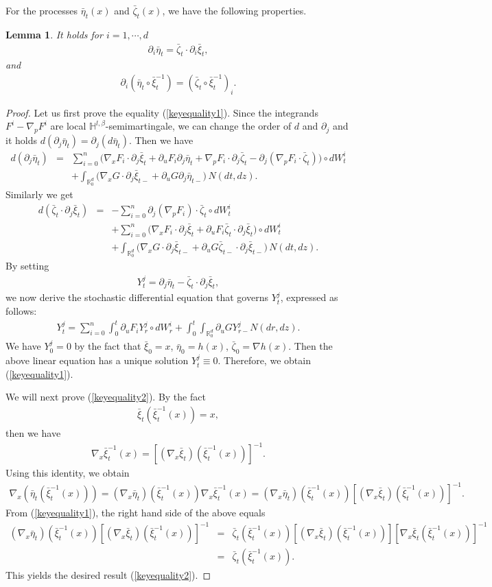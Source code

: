 \documentclass[12pt,oneside, reqno]{amsart}
\newcommand{\be}{\begin{eqnarray}}
\newcommand{\ee}{\end{eqnarray}}
\newcommand{\ce}{\begin{eqnarray*}}
\newcommand{\de}{\end{eqnarray*}}
\newtheorem{lemma}[theorem]{Lemma}
\def\no{\nonumber}
\def\mH{{\mathbb H}}
\def\mR{{\mathbb R}}
\numberwithin{equation}{section}
\begin{document}
     For the processes $\bar{\eta}_t(x)$ and $\bar{\zeta}_t(x)$, we have the following properties. 
     \begin{lemma}\label{equa-relation1}
     	It holds for $i=1,\cdots,d$
     	\be \label{keyequality1}
     	\partial_i \bar{\eta}_t=\bar{\zeta}_t\cdot \partial_i \bar{\xi}_t,
     	\ee 
     	and
      \be \label{keyequality2}
     	\partial_i (\bar{\eta}_t\circ \bar{\xi}_t^{-1})=(\bar{\zeta}_t\circ \bar{\xi}_t^{-1})_i.
     	\ee
     \end{lemma}
 \begin{proof}
 Let us first prove the equality (\ref{keyequality1}).  Since the integrands $F^i-\nabla_pF^i$ are local $\mH^{l,\beta}$-semimartingale, we can change the order of $d$ and $\partial_j$ and it holds 
 $d(\partial_j\bar{\eta}_t)=\partial_j (d\bar{\eta}_t)$. Then we have 
 \ce 
 d(\partial_j\bar{\eta}_t)&=&\sum_{i=0}^{n} \bigg(\nabla_xF_i\cdot \partial_j\bar{\xi}_t+\partial_uF_i \partial_j\bar{\eta}_t+\nabla_pF_i \cdot\partial_j\bar{\zeta}_t- \partial_j(\nabla_pF_i\cdot\bar{\zeta}_t) \bigg)\circ dW_t^i\\
 &&+\int_{\mR^d_0}\bigg( \nabla_xG\cdot \partial_j\bar{\xi}_{t-}+\partial_uG \partial_j\bar{\eta}_{t-} \bigg)\, N(dt,dz).
 \de 
 Similarly we get 
 	\ce 
 d(\bar{\zeta}_t\cdot \partial_j \bar{\xi}_t)&=&-\sum_{i=0}^{n}\partial_j(\nabla_p F_i)\cdot \bar{\zeta}_t\circ dW_t^i\\
 &&+\sum_{i=0}^{n} \bigg(\nabla_xF_i\cdot \partial_j \bar{\xi}_t+ \partial_uF_i\bar\zeta_t\cdot \partial_j \bar{\xi}_t \bigg)\circ dW_t^i\\
 &&+\int_{\mR^d_0}\bigg(\nabla_xG\cdot \partial_j \bar{\xi}_{t-}+\partial_uG\bar{\zeta}_{t-}\cdot \partial_j \bar{\xi}_{t-}\bigg)\,N(dt,dz).
 \de 
 By setting
 \ce 
 Y_t^j=\partial_j\bar{\eta}_t-\bar{\zeta}_t\cdot \partial_j \bar{\xi}_t,
 \de 
we now derive the stochastic differential equation that governs  $Y_t^j$,  expressed as follows:
 \ce 
 Y_t^j=\sum_{i=0}^{n} \int_0^t \partial_uF_i Y_r^j \circ dW_r^i+\int_0^t\int_{\mR^d_0}\partial_uGY_{r-}^j N(dr,dz). 
 \de 
 We have $Y_0^j=0$ by the fact that $\bar{\xi}_0=x$, $\bar{\eta}_0=h(x)$, $\bar{\zeta}_0=\nabla h(x)$. Then the above linear equation has a unique solution $Y_t^j\equiv 0$. Therefore, we obtain (\ref{keyequality1}).  
 
 We will next prove (\ref{keyequality2}). By the fact 
 \ce 
 \bar{\xi}_t(\bar{\xi}_t^{-1}(x))=x,
 \de 
 then we have 
 \ce 
 \nabla_x\bar{\xi}_t^{-1}(x)=[(\nabla_x\bar{\xi}_t)(\bar{\xi}_t^{-1}(x))]^{-1}.
 \de 
Using this identity, we obtain 
 	\ce 
 \nabla_x (\bar{\eta}_t(\bar{\xi}_t^{-1}(x)))=(\nabla_x\bar{\eta}_t)(\bar{\xi}_t^{-1}(x))\nabla_x\bar{\xi}_t^{-1}(x)=(\nabla_x\bar{\eta}_t)(\bar{\xi}_t^{-1}(x))[(\nabla_x\bar{\xi}_t)(\bar{\xi}_t^{-1}(x))]^{-1}.
 \de 
  From (\ref{keyequality1}), the right hand side of the above equals 
 	\be\label{keyequality30}
 (\nabla_x\bar{\eta}_t)(\bar{\xi}_t^{-1}(x))[(\nabla_x\bar{\xi}_t)(\bar{\xi}_t^{-1}(x))]^{-1}&=&\bar{\zeta}_t(\bar{\xi}_t^{-1}(x)) [(\nabla_x\bar{\xi}_t)(\bar{\xi}_t^{-1}(x))][\nabla_x\bar{\xi}_t(\bar{\xi}_t^{-1}(x))]^{-1}\no\\
 &=&\bar{\zeta}_t(\bar{\xi}_t^{-1}(x)).
 \ee 
This yields the desired result  (\ref{keyequality2}).
 \end{proof}
\end{document}
